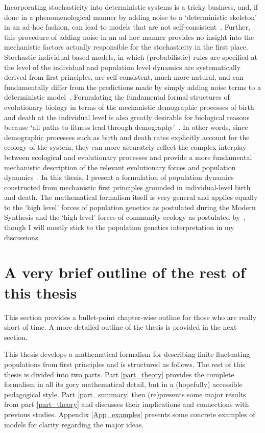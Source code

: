 Incorporating stochasticity into deterministic systems is a tricky business, and, if done in a phenomenological manner by adding noise to a `deterministic skeleton'~\citep{coulson_skeletons_2004} in an ad-hoc fashion, can lead to models that are not self-consistent~\citep{strang_how_2019}. Further, this procedure of adding noise in an ad-hoc manner provides no insight into the mechanistic factors actually responsible for the stochasticity in the first place. Stochastic individual-based models, in which (probabilistic) rules are specified at the level of the individual and population level dynamics are systematically derived from first principles, are self-consistent, much more natural, and can fundamentally differ from the predictions made by simply adding noise terms to a deterministic model~\citep{black_stochastic_2012,strang_how_2019}. Formulating the fundamental formal structures of evolutionary biology in terms of the mechanistic demographic processes of birth and death at the individual level is also greatly desirable for biological reasons~\citep{metcalf_why_2007,geritz_mathematical_2012} because `all paths to fitness lead through demography'~\citep{metcalf_all_2007}. In other words, since demographic processes such as birth and death rates explicitly account for the ecology of the system, they can more accurately reflect the complex interplay between ecological and evolutionary processes and provide a more fundamental mechanistic description of the relevant evolutionary forces and population dynamics~\citep{doebeli_towards_2017}. In this thesis, I present a formulation of population dynamics constructed from mechanistic first principles grounded in individual-level birth and death. The mathematical formalism itself is very general and applies equally to the `high level' forces of population genetics as postulated during the Modern Synthesis and the `high level' forces of community ecology as postulated by~\cite{vellend_theory_2016}, though I will mostly stick to the population genetics interpretation in my discussions.

\section{A very brief outline of the rest of this thesis}
This section provides a bullet-point chapter-wise outline for those who are really short of time. A more detailed outline of the thesis is provided in the next section.

This thesis develops a mathematical formalism for describing finite fluctuating populations from first principles and is structured as follows. The rest of this thesis is divided into two parts. Part \ref{part_theory} provides the complete formalism in all its gory mathematical detail, but in a (hopefully) accessible pedagogical style. Part \ref{part_summary} then (re)presents some major results from part \ref{part_theory} and discusses their implications and connections with previous studies. Appendix \ref{App_examples} presents some concrete examples of models for clarity regarding the major ideas.

